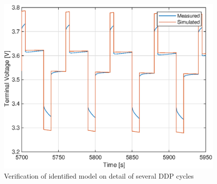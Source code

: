 \begin{figure}
    \centering
    \includegraphics{figures/6/ddp-detail.eps}
    \caption{Verification of identified model on detail of several DDP cycles}
    \label{fig:6-ddp-detail}
\end{figure}

